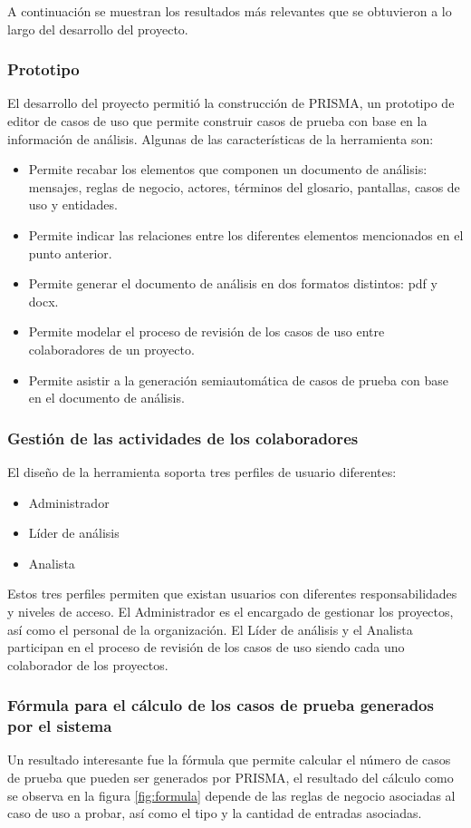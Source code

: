 A continuación se muestran los resultados más relevantes que se obtuvieron a lo largo del desarrollo del proyecto. 

\subsubsection*{Prototipo}
El desarrollo del proyecto permitió la construcción de PRISMA, un prototipo de editor de casos de uso que permite construir casos de prueba con base en la información de análisis. Algunas de las
características de la herramienta son:

\begin{itemize}
 \item Permite recabar los elementos que componen un documento de análisis: mensajes, reglas de negocio, actores, términos del glosario, pantallas, casos de uso y entidades.
 \item Permite indicar las relaciones entre los diferentes elementos mencionados en el punto anterior.
 \item Permite generar el documento de análisis en dos formatos distintos: pdf y docx.
 \item Permite modelar el proceso de revisión de los casos de uso entre colaboradores de un proyecto.
 \item Permite asistir a la generación semiautomática de casos de prueba con base en el documento de análisis.
\end{itemize}

\subsubsection*{Gestión de las actividades de los colaboradores}
El diseño de la herramienta soporta tres perfiles de usuario diferentes:
\begin{itemize}
 \item Administrador 
 \item Líder de análisis
 \item Analista
\end{itemize}

Estos tres perfiles permiten que existan usuarios con diferentes responsabilidades y niveles de acceso. El Administrador es el encargado de gestionar los proyectos, así como el personal de la organización. El Líder
de análisis y el Analista participan en el proceso de revisión de los casos de uso siendo cada uno colaborador de los proyectos.\\

\subsubsection*{Fórmula para el cálculo de los casos de prueba generados por el sistema}
Un resultado interesante fue la fórmula que permite calcular el número de casos de prueba que pueden ser generados por PRISMA, el resultado del cálculo como se observa en la figura \ref{fig:formula} 
depende de las reglas de negocio asociadas al caso de uso a probar, así como el tipo y la cantidad de entradas asociadas.


